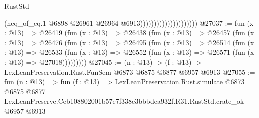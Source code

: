 \begin{lexlean}{RustStd}
\begin{coremodule}
                                            (heq_of_eq.{1}
                                              @6898
                                              @26961
                                              @26964
                                              @6913)))))))))))))))))))))
@27037 := fun (x : @13) =>
  @26419
    (fun (x : @13) =>
    @26438
      (fun (x : @13) =>
      @26457
        (fun (x : @13) =>
        @26476
          (fun (x : @13) =>
          @26495
            (fun (x : @13) =>
            @26514
              (fun (x : @13) =>
              @26533
                (fun (x : @13) => @26552 (fun (x : @13) => @26571 (fun (x : @13) => @27018)))))))))
@27045 := (n : @13) -> (f : @13) -> LexLeanPreservation.Rust.FunSem @6873 @6875 @6877 @6957 @6913
@27055 := fun (n : @13) =>
  fun (f : @13) =>
  LexLeanPreservation.Rust.simulate
    @6873
    @6875
    @6877
    LexLeanPreserve.Ceb108802001b57e7f338e3bbbdea932f.R31.RustStd.crate_ok
    @6957
    @6913
\end{coremodule}
\end{lexlean}
